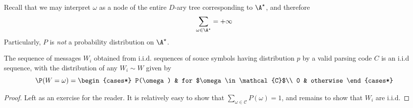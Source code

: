 \documentclass[toc, titlepaged]{../cs-classes/cs-classes}
\begin{document}
\begin{remark}
    Recall that we may interpret $\omega$ as a node of the entire $D$-ary tree corresponding to $\A^\star$, and therefore
    \begin{equation*}
        \sum_{\omega\in\A^\star} = +\infty
    \end{equation*}
    Particularly, $P$ is \emph{not} a probability distribution on $\A^\star$.
\end{remark}

\begin{lemma}
    \label{lem:distribution-parsed-messages}
    The sequence of messages $W_i$ obtained from i.i.d. sequences of souce symbols having distribution $p$ by a valid parsing code $C$ is an i.i.d sequence, with the distribution of any $W_i\sim W$ given by
    \begin{equation}
        \label{eq:def-P}
        \P(W=\omega) = \begin{cases*}
            P(\omega) & for $\omega\in\mathcal{C}$\\
            0 & otherwise
        \end{cases*}
    \end{equation}
\end{lemma}
\begin{proof}
    Left as an exercise for the reader. It is relatively easy to show that $\sum_{\omega\in\mathcal{C}}P(\omega)=1$, and remains to show that $W_i$ are i.i.d.
\end{proof}
\end{document}
